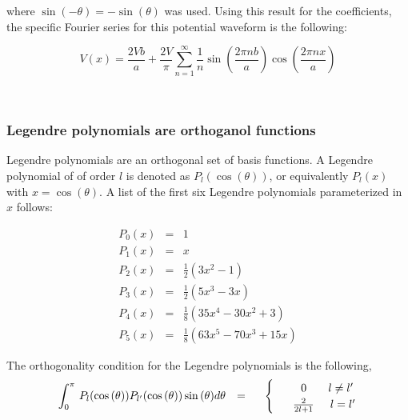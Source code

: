 \documentclass[12pt]{article}
\begin{document}
\begin{flushleft}
where $\sin{(-\theta)}=-\sin{(\theta)}$ was used.  Using this result for the coefficients, the specific Fourier series for this potential waveform is the following:

\begin{equation*}
V(x) = \frac{2Vb}{a} + \frac{2V}{\pi}\sum_{n=1}^{\infty} \frac{1}{n}\sin{\left(\frac{2\pi n b}{a}\right)}\cos{\left(\frac{2\pi nx}{a}\right)}
\end{equation*}

{\color{grey} \hrulefill}\\

\subsubsection*{\bf \color{mygreen} Legendre polynomials are orthoganol functions}

Legendre polynomials are an orthogonal set of basis functions.  A Legendre polynomial of of order $l$ is denoted as $P_{l}(\cos{(\theta)})$, or equivalently $P_{l}({x})$ with $x=\cos{(\theta)}$.  A list of the first six Legendre polynomials parameterized in $x$ follows:

\begin{eqnarray*}
P_{0}(x) & = & 1 \\
P_{1}(x) & = & x \\
P_{2}(x) & = & \frac{1}{2}(3x^{2}-1) \\
P_{3}(x) & = & \frac{1}{2}(5x^{3}-3x) \\
P_{4}(x) & = & \frac{1}{8}(35x^{4}-30x^{2}+3) \\
P_{5}(x) & = & \frac{1}{8}(63x^{5}-70x^{3}+15x)
\end{eqnarray*}

The orthogonality condition for the Legendre polynomials is the following,
\begin{equation}
\int_{0}^{\pi} \, P_{l}(\cos{(\theta)})P_{l^{\prime}}(\cos{(\theta)})\sin{(\theta)}d\theta \hspace{.1in} = \hspace{.2in}
\begin{cases}
 & \hspace{.2in} 0 \hspace{.27in}  l \neq l^{\prime} \\
 & \hspace{.1in} \frac{2}{2l+1}  \hspace{.2in}  l=l^{\prime}
\end{cases}
\label{eq:withcos}
\end{equation}


\end{flushleft}
\end{document}
